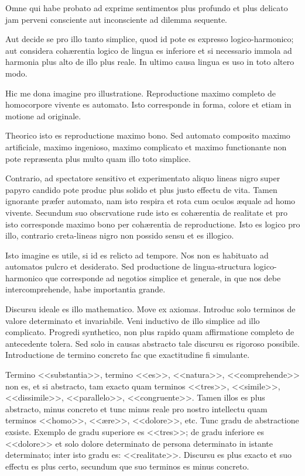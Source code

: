 Omne qui habe probato ad exprime sentimentos plus profundo et plus delicato jam perveni
consciente aut inconsciente ad dilemma sequente.

Aut decide se pro illo tanto simplice, quod id pote es expresso logico-harmonico; aut
considera coh\ae{}rentia logico de lingua es inferiore et si necessario immola ad
harmonia plus alto de illo plus reale. In ultimo causa lingua es uso in toto altero modo.

Hic me dona imagine pro illustratione. Reproductione maximo completo de homocorpore
vivente es automato. Isto corresponde in forma, colore et etiam in motione ad originale.

Theorico isto es reproductione maximo bono. Sed automato composito maximo artificiale,
maximo ingenioso, maximo complicato et maximo functionante non pote repr\ae{}senta plus
multo quam illo toto simplice.

Contrario, ad spectatore sensitivo et experimentato aliquo lineas nigro super papyro
candido pote produc plus solido et plus justo effectu de vita. Tamen ignorante pr\ae{}fer
automato, nam isto respira et rota cum oculos \ae{}quale ad homo vivente. Secundum suo
obscrvatione rude isto es coh\ae{}rentia de realitate et pro isto corresponde maximo bono
per coh\ae{}rentia de reproductione. Isto es logico pro illo, contrario creta-lineas
nigro non possido sensu et es illogico.

Isto imagine es utile, si id es relicto ad tempore. Nos non es habituato ad automatos
pulcro et desiderato. Sed productione de lingua-structura logico-harmonico que
corresponde ad negotios simplice et generale, in que nos debe intercomprehende, habe
importantia grande.

Discursu ideale es illo mathematico. Move ex axiomas. Introduc solo terminos de valore
determinato et invariabile. Veni inductivo de illo simplice ad illo complicato. Progredi
synthetico, non plus rapido quam affirmatione completo de antecedente tolera. Sed solo in
causas abstracto tale discursu es rigoroso possibile. Introductione de termino concreto
fac que exactitudine fi simulante.

Termino <<substantia>>, termino <<es>>, <<natura>>, <<comprehende>> non es, et si
abstracto, tam exacto quam terminos <<tres>>, <<simile>>, <<dissimile>>, <<parallelo>>,
<<congruente>>. Tamen illos es plus abstracto, minus concreto et tunc minus reale pro
nostro intellectu quam terminos <<homo>>, <<\ae{}re>>, <<dolore>>, etc. Tunc gradu de
abstractione exsiste. Exemplo de gradu superiore es <<tres>>; de gradu inferiore es
<<dolore>> et solo dolore determinato de persona determinato in istante determinato;
inter isto gradu es: <<realitate>>. Discursu es plus exacto et suo effectu es plus certo,
secundum que suo terminos es minus concreto.

